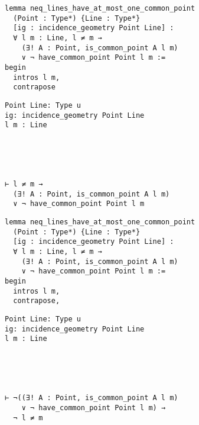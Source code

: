 \begin{frame}[fragile]
	\begin{multicols}{2}
		\begin{lstlisting}
lemma neq_lines_have_at_most_one_common_point 
  (Point : Type*) {Line : Type*} 
  [ig : incidence_geometry Point Line] :
  ∀ l m : Line, l ≠ m → 
    (∃! A : Point, is_common_point A l m) 
    ∨ ¬ have_common_point Point l m := 
begin
  intros l m,
  contrapose
\end{lstlisting}
		\columnbreak
		\begin{lstlisting}
Point Line: Type u
ig: incidence_geometry Point Line
l m : Line





⊢ l ≠ m → 
  (∃! A : Point, is_common_point A l m) 
  ∨ ¬ have_common_point Point l m
		\end{lstlisting}
	\end{multicols}
\end{frame}










\begin{frame}[fragile]
	\begin{multicols}{2}
		\begin{lstlisting}
lemma neq_lines_have_at_most_one_common_point 
  (Point : Type*) {Line : Type*} 
  [ig : incidence_geometry Point Line] :
  ∀ l m : Line, l ≠ m → 
    (∃! A : Point, is_common_point A l m) 
    ∨ ¬ have_common_point Point l m := 
begin
  intros l m,
  contrapose,
\end{lstlisting}
		\columnbreak
		\begin{lstlisting}
Point Line: Type u
ig: incidence_geometry Point Line
l m : Line





⊢ ¬((∃! A : Point, is_common_point A l m) 
    ∨ ¬ have_common_point Point l m) → 
  ¬ l ≠ m
		\end{lstlisting}
	\end{multicols}
\end{frame}










